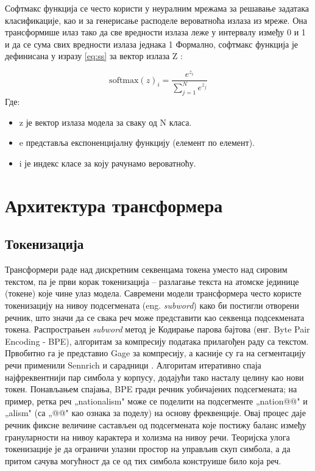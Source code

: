 Софтмакс функција се често користи у неуралним мрежама за решавање задатака класификације, као и за генерисање расподеле вероватноћа излаза из мреже. 
Она трансформише илаз тако да све вредности излаза леже у интервалу између 0 и 1 и да се сума свих вредности излаза једнака 1 
Формално, софтмакс функција је дефинисана у изразу \ref{eq:ss} за вектор излаза Z :
\newline

\begin{equation}
    \label{eq:ss}
    \text{softmax}(z)_i = \frac{e^{z_i}}{\sum_{j=1}^{N} e^{z_j}}
\end{equation}
\newline
\newline
Где:

\begin{itemize}
    \item z је вектор излаза модела за сваку од N класа.
    \item e представља експоненцијалну функцију (елемент по елемент).
    \item i је индекс класе за коју рачунамо вероватноћу.
\end{itemize}

\section{Архитектура трансформера}
\label{sec:transformer}

\subsection{Токенизација}

Трансформери раде над дискретним секвенцама токена уместо над сировим текстом, па је први корак токенизација -- разлагање текста на атомске јединице (токене) које чине улаз модела. Савремени модели трансформера често користе токенизацију на нивоу подсегмената (eng. \textit{subword}) како би постигли отворени речник, што значи да се свака реч може представити као секвенца подсекмената токена. Распрострањен \textit{subword} метод је Кодирање парова бајтова (енг. Byte Pair Encoding - BPE), алгоритам за компресију података прилагођен раду са текстом. Првобитно га је представио Gage за компресију, а касније су га на сегментацију речи применили Sennrich и сарадници \cite{gage_new_1994,sennrich_neural_2016}. Алгоритам итеративно спаја најфреквентнији пар симбола у корпусу, додајући тако насталу целину као нови токен. Понављањем спајања, BPE гради речник уобичајених подсегмената; на пример, ретка реч „nationalism" може се поделити на подсегменте „nation@@" и „alism" (са „@@" као ознака за поделу) на основу фреквенције. Овај процес даје речник фиксне величине састављен од подсегмената које постижу баланс између грануларности на нивоу карактера и холизма на нивоу речи. Теоријска улога токенизације је да ограничи улазни простор на управљив скуп симбола, а да притом сачува могућност да се од тих симбола конструише било која реч.

